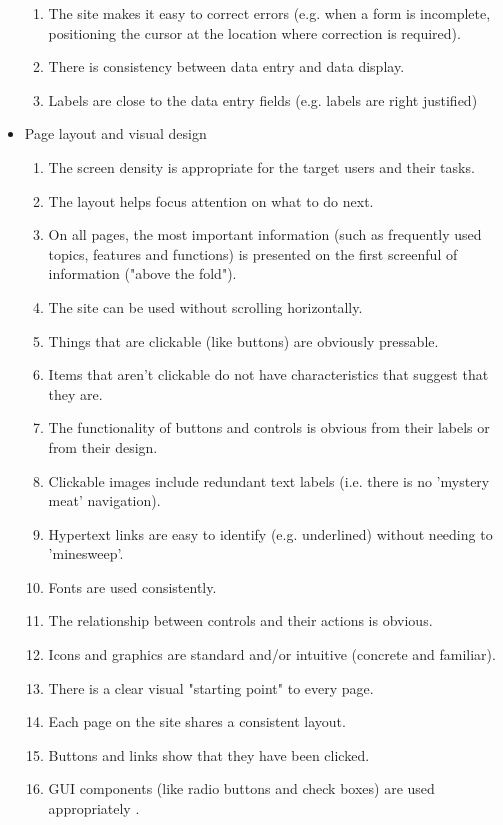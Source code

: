 \begin{itemize}
\begin{enumerate}
        \item The site makes it easy to correct errors (e.g. when a form is incomplete, positioning the cursor at the location where correction is required).
        \item There is consistency between data entry and data display.
        \item Labels are close to the data entry fields (e.g. labels are right justified)
      \end{enumerate}
  \item Page layout and visual design
      \begin{enumerate}
        \item The screen density is appropriate for the target users and their tasks.
        \item The layout helps focus attention on what to do next.
        \item On all pages, the most important information (such as frequently used topics, features and functions) is presented on the first screenful of information ("above the fold").
        \item The site can be used without scrolling horizontally.
        \item Things that are clickable (like buttons) are obviously pressable.
        \item Items that aren't clickable do not have characteristics that suggest that they are.
        \item The functionality of buttons and controls is obvious from their labels or from their design.
        \item Clickable images include redundant text labels (i.e. there is no 'mystery meat' navigation).
        \item Hypertext links are easy to identify (e.g. underlined) without needing to 'minesweep'.
        \item Fonts are used consistently.
        \item The relationship between controls and their actions is obvious.
        \item Icons and graphics are standard and/or intuitive (concrete and familiar).
        \item There is a clear visual "starting point" to every page.
        \item Each page on the site shares a consistent layout.
        \item Buttons and links show that they have been clicked.
        \item GUI components (like radio buttons and check boxes) are used appropriately .

\end{enumerate}
\end{itemize}
